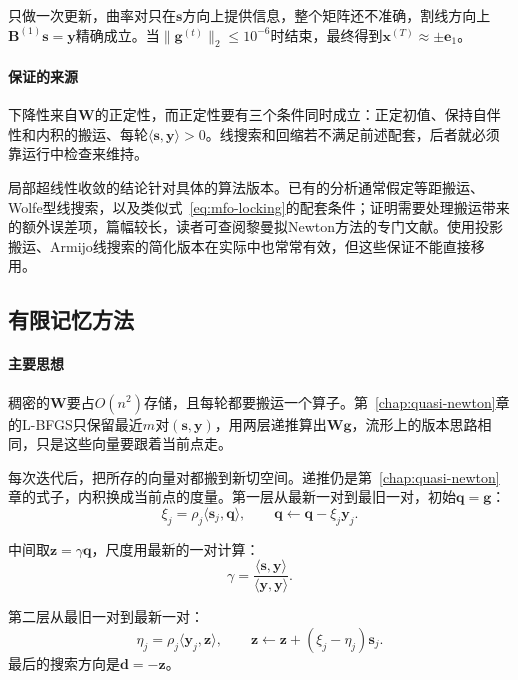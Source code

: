 只做一次更新，曲率对只在$\bm{s}$方向上提供信息，整个矩阵还不准确，割线方向上$\bm{B}^{(1)}\bm{s}=\bm{y}$精确成立。当$\lVert\bm{g}^{(t)}\rVert_2\leq10^{-6}$时结束，最终得到$\bm{x}^{(T)}\approx\pm\bm{e}_1$。

\paragraph{保证的来源}
下降性来自$\bm{W}$的正定性，而正定性要有三个条件同时成立：正定初值、保持自伴性和内积的搬运、每轮$\langle\bm{s},\bm{y}\rangle>0$。线搜索和回缩若不满足前述配套，后者就必须靠运行中检查来维持。

局部超线性收敛的结论针对具体的算法版本。已有的分析通常假定等距搬运、Wolfe型线搜索，以及类似式~\eqref{eq:mfo-locking}的配套条件；证明需要处理搬运带来的额外误差项，篇幅较长，读者可查阅黎曼拟Newton方法的专门文献。使用投影搬运、Armijo线搜索的简化版本在实际中也常常有效，但这些保证不能直接移用。

\subsection{有限记忆方法}
\label{sec:mfo-lbfgs}

\paragraph{主要思想}
稠密的$\bm{W}$要占$O(n^2)$存储，且每轮都要搬运一个算子。第~\ref{chap:quasi-newton}章的L-BFGS只保留最近$m$对$(\bm{s},\bm{y})$，用两层递推算出$\bm{W}\bm{g}$，流形上的版本思路相同，只是这些向量要跟着当前点走。

每次迭代后，把所存的向量对都搬到新切空间。递推仍是第~\ref{chap:quasi-newton}章的式子，内积换成当前点的度量。第一层从最新一对到最旧一对，初始$\bm{q}=\bm{g}$：
\begin{equation}
 \xi_j=\rho_j\langle\bm{s}_j,\bm{q}\rangle,\qquad
 \bm{q}\leftarrow\bm{q}-\xi_j\bm{y}_j.
 \label{eq:mfo-lbfgs-loop1}
\end{equation}

中间取$\bm{z}=\gamma\bm{q}$，尺度用最新的一对计算：
\[
 \gamma=\frac{\langle\bm{s},\bm{y}\rangle}{\langle\bm{y},\bm{y}\rangle}.
\]

第二层从最旧一对到最新一对：
\begin{equation}
 \eta_j=\rho_j\langle\bm{y}_j,\bm{z}\rangle,\qquad
 \bm{z}\leftarrow\bm{z}+(\xi_j-\eta_j)\bm{s}_j.
 \label{eq:mfo-lbfgs-loop2}
\end{equation}
最后的搜索方向是$\bm{d}=-\bm{z}$。


